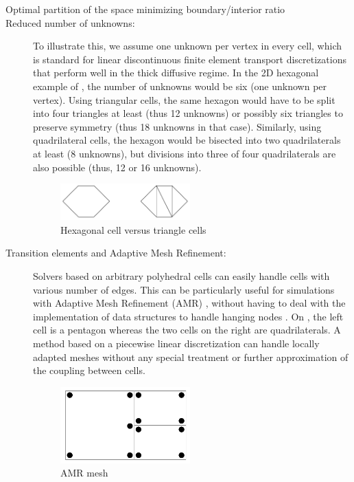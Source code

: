 \begin{description}
  \item[Optimal partition of the space minimizing boundary/interior ratio]
  \item[Reduced number of unknowns:] To illustrate this, we assume
    one unknown per vertex in every cell, which is standard for linear discontinuous
    finite element transport discretizations that perform well in the thick
    diffusive regime. In the 2D hexagonal example of ,
    the number of unknowns would be six (one unknown per vertex). Using
    triangular cells, the same hexagon would have to be split into four
    triangles at least (thus 12 unknowns) or possibly six triangles to
    preserve symmetry (thus 18 unknowns in that case). Similarly, using
    quadrilateral cells, the hexagon would be bisected into two quadrilaterals
    at least (8 unknowns), but divisions into three of four quadrilaterals are
    also possible (thus, 12 or 16 unknowns).
    \begin{figure}[H]
      \centering
      \includegraphics[width=5cm]{hex_tri_cells}
      \caption{Hexagonal cell versus triangle cells}
      \label{fig_hex_vs_tri}
    \end{figure}
  \item[Transition elements and Adaptive Mesh Refinement:] Solvers based on
    arbitrary polyhedral cells can easily handle cells with various number of
    edges. This can be particularly useful for simulations
    with Adaptive Mesh Refinement (AMR) \cite{Jessee1998,Baker2002,Wang2010a}, 
    without having to deal with the implementation of data structures to handle 
    hanging nodes \cite{Solin2008,Bangerth2007,Arnold2000}. On , 
    the left cell is a pentagon whereas the two cells on the right are 
    quadrilaterals. A method based on a piecewise linear discretization can
    handle locally adapted meshes without any special treatment or further
    approximation of the coupling between cells.
    \begin{figure}[H]
      \centering
      \includegraphics[width=5cm]{amr}
      \caption{AMR mesh}
      \label{fig_amr_cells}
    \end{figure}
\end{description}
